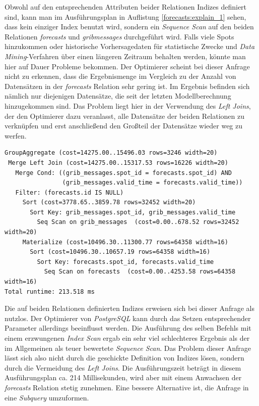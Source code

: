 Obwohl auf den entsprechenden Attributen beider Relationen Indizes
definiert sind, kann man im Ausführungsplan in Auflistung
\ref{forecasts:explain_1} sehen, dass kein einziger Index benutzt
wird, sondern ein \textit{Sequence Scan} auf den beiden Relationen
\textit{forecasts} und \textit{grib\textunderscore messages}
durchgeführt wird. Falls viele Spots hinzukommen oder historische
Vorhersagedaten für statistische Zwecke und \textit{Data
  Mining}-Verfahren über einen längeren Zeitraum behalten werden,
könnte man hier auf Dauer Probleme bekommen. Der Optimierer scheint
bei dieser Anfrage nicht zu erkennen, dass die Ergebnismenge im
Vergleich zu der Anzahl von Datensätzen in der \textit{forecasts}
Relation sehr gering ist. Im Ergebnis befinden sich nämlich nur
diejenigen Datensätze, die seit der letzten Modellberechnung
hinzugekommen sind. Das Problem liegt hier in der Verwendung des
\textit{Left Joins}, der den Optimierer dazu veranlasst, alle
Datensätze der beiden Relationen zu verknüpfen und erst anschließend
den Großteil der Datensätze wieder weg zu werfen.

\begin{lstlisting}[captionpos=b, caption=Ausführungsplan des \textit{Left Joins}, label=forecasts:explain_1]
GroupAggregate (cost=14275.00..15496.03 rows=3246 width=20)
 Merge Left Join (cost=14275.00..15317.53 rows=16226 width=20)
   Merge Cond: ((grib_messages.spot_id = forecasts.spot_id) AND 
                (grib_messages.valid_time = forecasts.valid_time))
   Filter: (forecasts.id IS NULL)
     Sort (cost=3778.65..3859.78 rows=32452 width=20)
       Sort Key: grib_messages.spot_id, grib_messages.valid_time
         Seq Scan on grib_messages  (cost=0.00..678.52 rows=32452 width=20)
     Materialize (cost=10496.30..11300.77 rows=64358 width=16)
       Sort (cost=10496.30..10657.19 rows=64358 width=16)
         Sort Key: forecasts.spot_id, forecasts.valid_time
           Seq Scan on forecasts  (cost=0.00..4253.58 rows=64358 width=16)
Total runtime: 213.518 ms
\end{lstlisting}

Die auf beiden Relationen definierten Indizes erweisen sich bei dieser
Anfrage als nutzlos. Der Optimierer von \textit{PostgreSQL} kann durch
das Setzen entsprechender Parameter allerdings beeinflusst werden. Die
Ausführung des selben Befehls mit einem erzwungenen \textit{Index
  Scan} ergab ein sehr viel schlechteres Ergebnis als der im
Allgemeinen als teuer bewertete \textit{Sequence Scan}. Das Problem
dieser Anfrage lässt sich also nicht durch die geschickte Definition
von Indizes lösen, sondern durch die Vermeidung des \textit{Left
  Joins}. Die Ausführungszeit beträgt in diesem Ausführungsplan
ca. 214 Millisekunden, wird aber mit einem Anwachsen der
\textit{forecasts} Relation stetig zunehmen. Eine bessere Alternative
ist, die Anfrage in eine \textit{Subquery} umzuformen.

